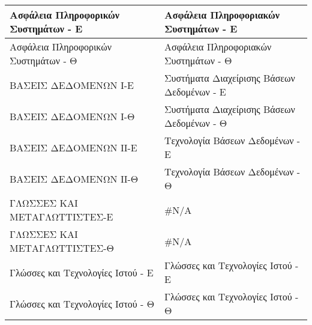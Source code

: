 \documentclass[12pt,a4paper,final]{article}
\begin{document}
\begin{landscape}
\begin{center}
\begin{longtable}{|l|l|}
\hline
Ασφάλεια Πληροφορικών Συστημάτων - Ε                                                                            & Ασφάλεια Πληροφοριακών Συστημάτων - Ε                                                                                \\ 
\hline
Ασφάλεια Πληροφορικών Συστημάτων - Θ                                                                            & Ασφάλεια Πληροφοριακών Συστημάτων - Θ                                                                                \\ 
\hline
ΒΑΣΕΙΣ ΔΕΔΟΜΕΝΩΝ Ι-Ε                                                                                            & Συστήματα Διαχείρισης Βάσεων Δεδομένων - Ε                                                                           \\ 
\hline
ΒΑΣΕΙΣ ΔΕΔΟΜΕΝΩΝ Ι-Θ                                                                                            & Συστήματα Διαχείρισης Βάσεων Δεδομένων - Θ                                                                           \\ 
\hline
ΒΑΣΕΙΣ ΔΕΔΟΜΕΝΩΝ ΙΙ-Ε                                                                                           & Τεχνολογία Βάσεων Δεδομένων - Ε                                                                                      \\ 
\hline
ΒΑΣΕΙΣ ΔΕΔΟΜΕΝΩΝ ΙΙ-Θ                                                                                           & Τεχνολογία Βάσεων Δεδομένων - Θ                                                                                      \\ 
\hline
ΓΛΩΣΣΕΣ ΚΑΙ ΜΕΤΑΓΛΩΤΤΙΣΤΕΣ-Ε                                                                                    & \#N/A                                                                                                                \\ 
\hline
ΓΛΩΣΣΕΣ ΚΑΙ ΜΕΤΑΓΛΩΤΤΙΣΤΕΣ-Θ                                                                                    & \#N/A                                                                                                                \\ 
\hline
Γλώσσες και Τεχνολογίες Ιστού - Ε                                                                               & Γλώσσες και Τεχνολογίες Ιστού - Ε                                                                                    \\ 
\hline
Γλώσσες και Τεχνολογίες Ιστού - Θ                                                                               & Γλώσσες και Τεχνολογίες Ιστού - Θ                                                                                    \\ 

\end{longtable}
\end{center}
\end{landscape}
\end{document}
